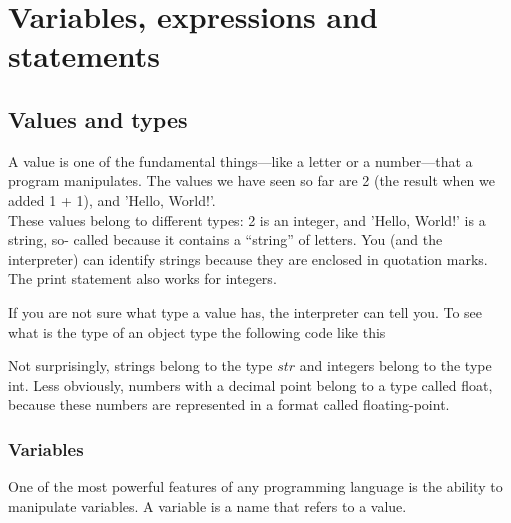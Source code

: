 \chapter{Variables, expressions and statements}

\section{Values and types}
\noindent A value is one of the fundamental things—like a letter or a number—that a program manipulates. The values we have seen so far are 2 (the result when we added 1 + 1), and ’Hello, World!’.\\

\noindent These values belong to different types: 2 is an integer, and ’Hello, World!’ is a string, so- called because it contains a “string” of letters. You (and the interpreter) can identify strings because they are enclosed in quotation marks.
The print statement also works for integers.

\noindent\begin{minipage}{\linewidth}

\end{minipage}

If you are not sure what type a value has, the interpreter can tell you. To see what is the type of an object type the following code like this

\noindent\begin{minipage}{\linewidth}

\end{minipage}

\noindent\begin{minipage}{\linewidth}

\end{minipage}

Not surprisingly, strings belong to the type $str$ and integers belong to the type int. Less obviously, numbers with a decimal point belong to a type called float, because these numbers are represented in a format called floating-point.

\subsection{Variables}

\noindent One of the most powerful features of any programming language is the ability to manipulate variables. A variable is a name that refers to a value.\\

